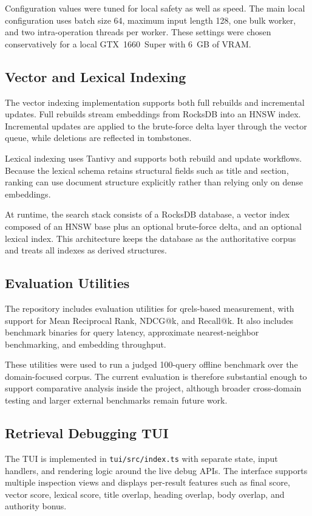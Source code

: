 \documentclass[conference]{IEEEtran}
\begin{document}
Configuration values were tuned for local safety as well as speed. The main local configuration uses batch size 64, maximum input length 128, one bulk worker, and two intra-operation threads per worker. These settings were chosen conservatively for a local GTX~1660~Super with 6~GB of VRAM.

\subsection{Vector and Lexical Indexing}
The vector indexing implementation supports both full rebuilds and incremental updates. Full rebuilds stream embeddings from RocksDB into an HNSW index. Incremental updates are applied to the brute-force delta layer through the vector queue, while deletions are reflected in tombstones.

Lexical indexing uses Tantivy and supports both rebuild and update workflows. Because the lexical schema retains structural fields such as title and section, ranking can use document structure explicitly rather than relying only on dense embeddings.

At runtime, the search stack consists of a RocksDB database, a vector index composed of an HNSW base plus an optional brute-force delta, and an optional lexical index. This architecture keeps the database as the authoritative corpus and treats all indexes as derived structures.

\subsection{Evaluation Utilities}
The repository includes evaluation utilities for qrels-based measurement, with support for Mean Reciprocal Rank, NDCG@k, and Recall@k. It also includes benchmark binaries for query latency, approximate nearest-neighbor benchmarking, and embedding throughput.

These utilities were used to run a judged 100-query offline benchmark over the domain-focused corpus. The current evaluation is therefore substantial enough to support comparative analysis inside the project, although broader cross-domain testing and larger external benchmarks remain future work.

\subsection{Retrieval Debugging TUI}
The TUI is implemented in \texttt{tui/src/index.ts} with separate state, input handlers, and rendering logic around the live debug APIs. The interface supports multiple inspection views and displays per-result features such as final score, vector score, lexical score, title overlap, heading overlap, body overlap, and authority bonus.
\end{document}

